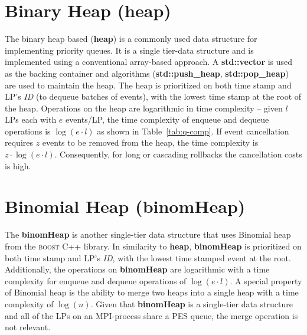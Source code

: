 \section{Binary Heap (heap)} 
The binary heap based (\textbf{heap}) is a commonly used data structure for implementing priority queues. It is a single tier-data structure and is implemented using a conventional array-based approach. A \textbf{std::vector} is used as the backing container and algorithms (\textbf{std::push\_heap}, \textbf{std::pop\_heap}) are used to maintain the heap. The heap is prioritized on both time stamp and LP's \emph{ID} (to dequeue batches of events), with the lowest time stamp at the root of the heap. Operations on the heap are logarithmic in time complexity -- given $l$ LPs each with $e$ events/LP, the time complexity of enqueue and dequeue operations is $\log(e\cdot l)$ as shown in Table~\ref{tab:q-comp}. If event cancellation requires $z$ events to be removed from the heap, the time complexity is $z\cdot \log(e\cdot l)$. Consequently, for long or cascading rollbacks the cancellation costs is high.

\section{Binomial Heap (binomHeap)} 
The \textbf{binomHeap} is another single-tier data structure that uses Binomial heap from the \textsc{boost} C++ library. In similarity to \textbf{heap}, \textbf{binomHeap} is prioritized on both time stamp and LP's \emph{ID}, with the lowest time stamped event at the root. Additionally, the operations on \textbf{binomHeap} are logarithmic with a time complexity for enqueue and dequeue operations of $\log(e\cdot l)$. A special property of Binomial heap is the ability to merge two heaps into a single heap with a time complexity of $\log(n)$. Given that \textbf{binomHeap} is a single-tier data structure and all of the LPs on an MPI-process share a PES queue, the merge operation is not relevant.

